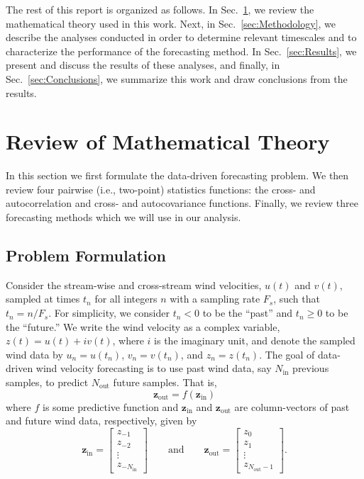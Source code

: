 \documentclass[11pt, oneside]{article}
\newcommand{\secref}[1]{Sec.~\ref{#1}}
\begin{document}
The rest of this report is organized as follows.
In \secref{sec:Theory}, we review the mathematical theory used in this work.
Next, in \secref{sec:Methodology}, we describe the analyses conducted in order to determine relevant timescales and to characterize the performance of the forecasting method.
In \secref{sec:Results}, we present and discuss the results of these analyses, and finally,
in \secref{sec:Conclusions}, we summarize this work and draw conclusions from the results.

\section{Review of Mathematical Theory}\label{sec:Theory}
In this section we first formulate the data-driven forecasting problem.
We then review four pairwise (i.e., two-point) statistics functions: the cross- and autocorrelation and cross- and autocovariance functions.
Finally, we review three forecasting methods which we will use in our analysis.

\subsection{Problem Formulation}
Consider the stream-wise and cross-stream wind velocities, $u(t)$ and $v(t)$, sampled at times $t_n$ for all integers $n$ with a sampling rate $F_s$, such that $t_n = n/F_s$.
For simplicity, we consider $t_n < 0$ to be the ``past'' and $t_n \geq 0$ to be the ``future.''
We write the wind velocity as a complex variable, $z(t) = u(t) + i v(t)$, where $i$ is the imaginary unit, and denote the sampled wind data by $u_n = u(t_n)$, $v_n = v(t_n)$, and $z_n = z(t_n)$.
The goal of data-driven wind velocity forecasting is to use past wind data, say $N_\text{in}$ previous samples, to predict $N_\text{out}$ future samples.
That is, 
\begin{equation} %
\mathbf{z}_\text{out} = f(\mathbf{z}_\text{in})
\end{equation}
where $f$ is some predictive function and $\mathbf{z}_\textrm{in}$ and $\mathbf{z}_\text{out}$ are column-vectors of past and future wind data, respectively, given by
\begin{equation}
\mathbf{z}_\text{in} = 
\begin{bmatrix}
z_{-1} \\ z_{-2} \\ \vdots \\ z_{-N_\text{in}}
\end{bmatrix}
\quad\quad \text{and} \quad\quad
\mathbf{z}_\text{out} = 
\begin{bmatrix}
z_{0} \\ z_{1} \\ \vdots \\ z_{N_\text{out} - 1}
\end{bmatrix}.
\end{equation}
\end{document}
